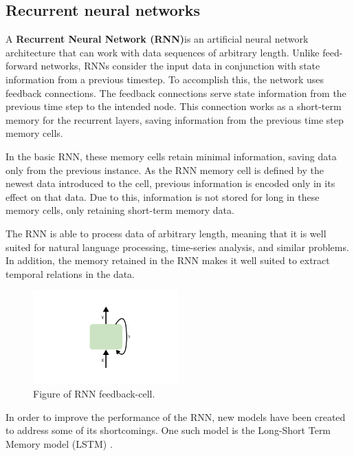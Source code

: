 \subsection{Recurrent neural networks}
\label{section:BT:RNN}

A \textbf{Recurrent Neural Network (RNN)}is an artificial neural network architecture that can work with data sequences of arbitrary length.
Unlike feed-forward networks, RNNs consider the input data in conjunction with state information from a previous timestep.
To accomplish this, the network uses feedback connections.
The feedback connections serve state information from the previous time step to the intended node.
This connection works as a short-term memory for the recurrent layers, saving information from the previous time step memory cells.

In the basic RNN, these memory cells retain minimal information, saving data only from the previous instance.
As the RNN memory cell is defined by the newest data introduced to the cell, previous information is encoded only in its effect on that data.
Due to this, information is not stored for long in these memory cells, only retaining short-term memory data.

The RNN is able to process data of arbitrary length, meaning that it is well suited for natural language processing, time-series analysis, and similar problems.
In addition, the memory retained in the RNN makes it well suited to extract temporal relations in the data.

\begin{figure}[h!]
  \centering
  \includegraphics[width=0.5\textwidth]{./sections/BT/figures/RNN.png}
  \hfill
  \caption{Figure of RNN feedback-cell.}
  \label{fig:rnn-cell}
\end{figure}



In order to improve the performance of the RNN, new models have been created to address some of its shortcomings.
One such model is the Long-Short Term Memory model (LSTM) \cite[p.~469-472]{Geron2017}.


